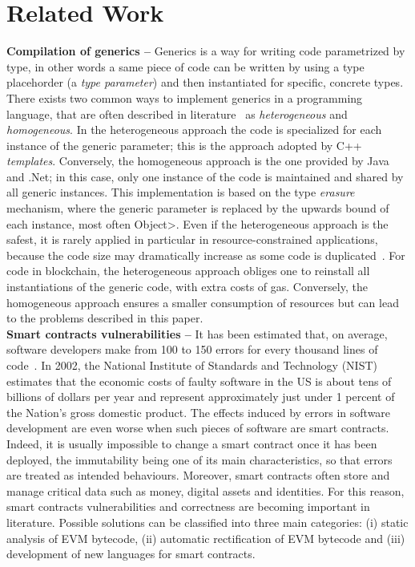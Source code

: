 \section{Related Work}\label{sec:related_work}



\textbf{Compilation of generics --}
Generics is a way for writing code parametrized by type, in other words a same piece of code can
be written by using a type placehorder (a \emph{type parameter}) and then instantiated for specific,
concrete types. There exists two common ways to implement generics in a programming language,
that are often described in literature~\cite{generics_categories} as \emph{heterogeneous}
and \emph{homogeneous}. In the heterogeneous approach the code is specialized for each instance
of the generic parameter; this is the approach adopted by C++ \emph{templates}.
Conversely, the homogeneous approach is the one provided by Java and .Net; in this case,
only one instance of the code is maintained and shared by all generic instances.
This implementation is based on the type \emph{erasure} mechanism, where the generic parameter
is replaced by the upwards bound of each instance, most often \<Object>.
Even if the heterogeneous approach is the safest, it is rarely applied in particular
in resource-constrained applications, because the code size may dramatically increase
as some code is duplicated~\cite{generics_embedded_systems}. For code in blockchain,
the heterogeneous approach obliges one to reinstall all instantiations of the generic code,
with extra costs of gas.
Conversely, the homogeneous approach ensures a smaller consumption
of resources but can lead to the problems described in this paper. \\

\textbf{Smart contracts vulnerabilities --}
It has been estimated that, on average, software developers make from 100 to 150 errors
for every thousand lines of code~\cite{software_engineering}.
In 2002, the National Institute of Standards and Technology (NIST) estimates that the economic
costs of faulty software in the US is about tens of billions of dollars per year and represent
approximately just under 1 percent of the Nation's gross domestic product.
The effects induced by errors in software development are even worse when such pieces of software
are smart contracts. Indeed, it is usually impossible to change a smart contract once
it has been deployed, the immutability being one of its main characteristics, so that
errors are treated as intended behaviours. Moreover, smart contracts often store and
manage critical data such as money, digital assets and identities. For this reason, smart contracts
vulnerabilities and correctness are becoming important in literature. Possible solutions can be
classified into three main categories: (i) static analysis of EVM bytecode,
(ii) automatic rectification of EVM bytecode and (iii) development of new languages
for smart contracts.

